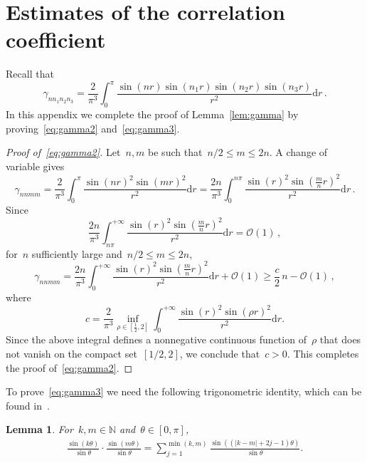 \documentclass[11pt,reqno,english]{amsart}
\numberwithin{equation}{section}
\theoremstyle{plain}
\newtheorem{lemma}[theorem]{Lemma}
\theoremstyle{definition}
\theoremstyle{remark}
\begin{document}
	\appendix 
	
	
	
	\appendix


\section{Estimates of the correlation coefficient}
\label{sub:gamma}
Recall that
\[
\gamma_{nn_1n_2n_3}
=\frac{2}{\pi^{3}}
\int_{0}^{\pi}
\frac{\sin(nr)\sin(n_{1}r)\sin(n_{2}r)\sin(n_{3}r)}{r^{2}}
\mathrm{d}r\,.
\]
In this appendix we complete the proof of Lemma~\ref{lem:gamma} by proving~\eqref{eq:gamma2} and~\eqref{eq:gamma3}.

\begin{proof}[Proof of~\eqref{eq:gamma2}]
	Let~$n,m$ be such that~$n/2\leq m\leq 2n$. A change of variable gives
	\[
	\gamma_{nnmm}
	=
	\frac{2}{\pi^{3}}\int_{0}^{\pi}
	\frac{\sin(nr)^{2}\sin(mr)^{2}}{r^{2}}
	\mathrm{d}r
	=
	\frac{2n}{\pi^{3}}\int_{0}^{n\pi}
	\frac{\sin(r)^{2}\sin(\frac{m}{n}r)^{2}}{r^{2}}
	\mathrm{d}r\,.
	\]
	Since
	\[
	\frac{2n}{\pi^{3}}\int_{n\pi}^{+\infty}
	\frac{\sin(r)^{2}\sin(\frac{m}{n}r)^{2}}{r^{2}}
	\mathrm{d}r=\mathcal{O}(1)\,,
	\]
	for~$n$ sufficiently large and~$n/2\leq m\leq 2n$,
	\[
	\gamma_{nnmm} = \frac{2n}{\pi^{3}}\int_{0}^{+\infty}
	\frac{\sin(r)^{2}\sin(\frac{m}{n}r)^{2}}{r^{2}}
	\mathrm{d}r + \mathcal{O}(1)
	\geq \frac{c}{2}\,n-\mathcal{O}(1)\,,
	\]
	where
	\[
	c= \frac{2}{\pi^{3}}\inf_{\rho\in[\frac{1}{2},2]}
	\int_{0}^{+\infty}
	\frac{\sin(r)^{2}\sin(\rho r)^{2}}{r^{2}}
	\mathrm{d}r.
	\]
	Since the above integral defines a nonnegative continuous function of~$\rho$ that does not vanish on the compact set~$[1/2,2]$, we conclude that~$c>0$. This completes the proof of~\eqref{eq:gamma2}.
\end{proof}


To prove~\eqref{eq:gamma3} we need the following trigonometric identity, which can be found in~\cite[equation~(10.1)]{Tzv08}.
\begin{lemma}\label{trignometric}
	For~$k,m\in\mathbb{N}$ and~$\theta\in[0,\pi]$,
	\begin{align}\label{eq:trigo}
		\frac{\sin(k\theta)}{\sin\theta}\cdot\frac{\sin(m\theta)}{\sin\theta}=\sum_{j=1}^{\min(k,m)}\frac{\sin((|k-m|+2j-1)\theta)}{\sin\theta}.
	\end{align}
\end{lemma}
\end{document}

